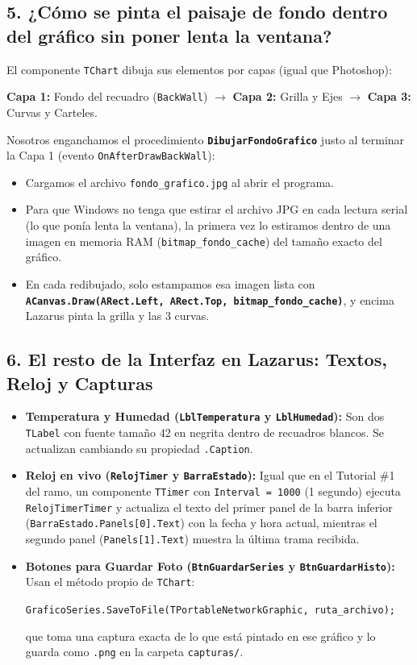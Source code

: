 \documentclass[11pt,a4paper]{article}
\begin{document}
\subsection{5. ¿Cómo se pinta el paisaje de fondo dentro del gráfico sin poner lenta la ventana?}
El componente \texttt{TChart} dibuja sus elementos por capas (igual que Photoshop):
\begin{center}
\textbf{Capa 1:} Fondo del recuadro (\texttt{BackWall}) $\rightarrow$ \textbf{Capa 2:} Grilla y Ejes $\rightarrow$ \textbf{Capa 3:} Curvas y Carteles.
\end{center}
Nosotros enganchamos el procedimiento \textbf{\texttt{DibujarFondoGrafico}} justo al terminar la Capa 1 (evento \texttt{OnAfterDrawBackWall}):
\begin{itemize}[leftmargin=1.5em]
    \item Cargamos el archivo \texttt{fondo\_grafico.jpg} al abrir el programa.
    \item Para que Windows no tenga que estirar el archivo JPG en cada lectura serial (lo que ponía lenta la ventana), la primera vez lo estiramos dentro de una imagen en memoria RAM (\texttt{bitmap\_fondo\_cache}) del tamaño exacto del gráfico.
    \item En cada redibujado, solo estampamos esa imagen lista con \textbf{\texttt{ACanvas.Draw(ARect.Left, ARect.Top, bitmap\_fondo\_cache)}}, y encima Lazarus pinta la grilla y las 3 curvas.
\end{itemize}

\subsection{6. El resto de la Interfaz en Lazarus: Textos, Reloj y Capturas}
\begin{itemize}[leftmargin=1.5em]
    \item \textbf{Temperatura y Humedad (\texttt{LblTemperatura} y \texttt{LblHumedad}):} Son dos \texttt{TLabel} con fuente tamaño 42 en negrita dentro de recuadros blancos. Se actualizan cambiando su propiedad \texttt{.Caption}.
    \item \textbf{Reloj en vivo (\texttt{RelojTimer} y \texttt{BarraEstado}):} Igual que en el Tutorial \#1 del ramo, un componente \texttt{TTimer} con \texttt{Interval = 1000} (1 segundo) ejecuta \texttt{RelojTimerTimer} y actualiza el texto del primer panel de la barra inferior (\texttt{BarraEstado.Panels[0].Text}) con la fecha y hora actual, mientras el segundo panel (\texttt{Panels[1].Text}) muestra la última trama recibida.
    \item \textbf{Botones para Guardar Foto (\texttt{BtnGuardarSeries} y \texttt{BtnGuardarHisto}):} Usan el método propio de \texttt{TChart}:
    \begin{center}
    \texttt{GraficoSeries.SaveToFile(TPortableNetworkGraphic, ruta\_archivo);}
    \end{center}
    que toma una captura exacta de lo que está pintado en ese gráfico y lo guarda como \texttt{.png} en la carpeta \texttt{capturas/}.
\end{itemize}
\end{document}
